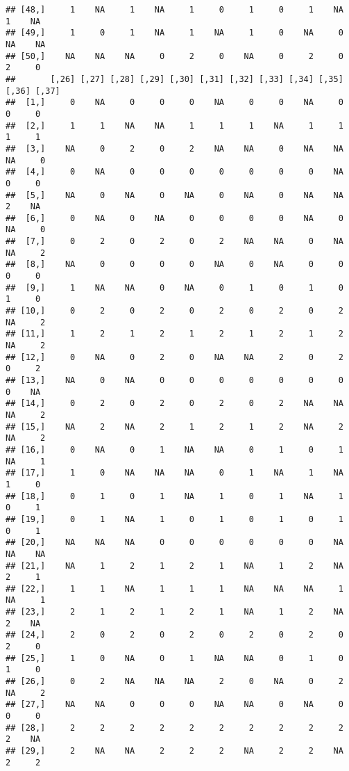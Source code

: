 \documentclass[
]{article}
\begin{document}
\begin{verbatim}
## [48,]     1    NA     1    NA     1     0     1     0     1    NA     1    NA
## [49,]     1     0     1    NA     1    NA     1     0    NA     0    NA    NA
## [50,]    NA    NA    NA     0     2     0    NA     0     2     0     2     0
##       [,26] [,27] [,28] [,29] [,30] [,31] [,32] [,33] [,34] [,35] [,36] [,37]
##  [1,]     0    NA     0     0     0    NA     0     0    NA     0     0     0
##  [2,]     1     1    NA    NA     1     1     1    NA     1     1     1     1
##  [3,]    NA     0     2     0     2    NA    NA     0    NA    NA    NA     0
##  [4,]     0    NA     0     0     0     0     0     0     0    NA     0     0
##  [5,]    NA     0    NA     0    NA     0    NA     0    NA    NA     2    NA
##  [6,]     0    NA     0    NA     0     0     0     0    NA     0    NA     0
##  [7,]     0     2     0     2     0     2    NA    NA     0    NA    NA     2
##  [8,]    NA     0     0     0     0    NA     0    NA     0     0     0     0
##  [9,]     1    NA    NA     0    NA     0     1     0     1     0     1     0
## [10,]     0     2     0     2     0     2     0     2     0     2    NA     2
## [11,]     1     2     1     2     1     2     1     2     1     2    NA     2
## [12,]     0    NA     0     2     0    NA    NA     2     0     2     0     2
## [13,]    NA     0    NA     0     0     0     0     0     0     0     0    NA
## [14,]     0     2     0     2     0     2     0     2    NA    NA    NA     2
## [15,]    NA     2    NA     2     1     2     1     2    NA     2    NA     2
## [16,]     0    NA     0     1    NA    NA     0     1     0     1    NA     1
## [17,]     1     0    NA    NA    NA     0     1    NA     1    NA     1     0
## [18,]     0     1     0     1    NA     1     0     1    NA     1     0     1
## [19,]     0     1    NA     1     0     1     0     1     0     1     0     1
## [20,]    NA    NA    NA     0     0     0     0     0     0    NA    NA    NA
## [21,]    NA     1     2     1     2     1    NA     1     2    NA     2     1
## [22,]     1     1    NA     1     1     1    NA    NA    NA     1    NA     1
## [23,]     2     1     2     1     2     1    NA     1     2    NA     2    NA
## [24,]     2     0     2     0     2     0     2     0     2     0     2     0
## [25,]     1     0    NA     0     1    NA    NA     0     1     0     1     0
## [26,]     0     2    NA    NA    NA     2     0    NA     0     2    NA     2
## [27,]    NA    NA     0     0     0    NA    NA     0    NA     0     0     0
## [28,]     2     2     2     2     2     2     2     2     2     2     2    NA
## [29,]     2    NA    NA     2     2     2    NA     2     2    NA     2     2

\end{verbatim}
\end{document}
